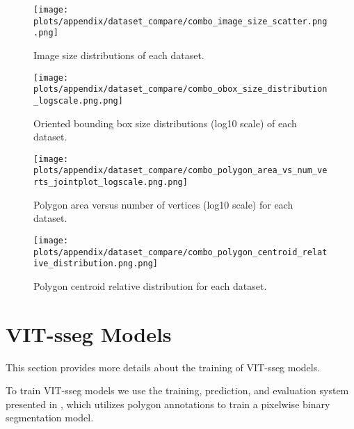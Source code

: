 \begin{figure*}[ht]
\centering
\texttt{[image: plots/appendix/dataset\_compare/combo\_image\_size\_scatter.png.png]}
\caption[]{
    Image size distributions of each dataset.
}
\label{fig:combo_image_size_scatter}
\end{figure*}


\begin{figure*}[ht]
\centering
\texttt{[image: plots/appendix/dataset\_compare/combo\_obox\_size\_distribution\_logscale.png.png]}
\caption[]{
    Oriented bounding box size distributions (log10 scale) of each dataset.
}
\label{fig:combo_obox_size_distribution_logscale}
\end{figure*}

\begin{figure*}[ht]
\centering
\texttt{[image: plots/appendix/dataset\_compare/combo\_polygon\_area\_vs\_num\_verts\_jointplot\_logscale.png.png]}
\caption[]{
    Polygon area versus number of vertices (log10 scale) for each dataset.
}
\label{fig:combo_polygon_area_vs_num_verts_jointplot}
\end{figure*}

\begin{figure*}[ht]
\centering
\texttt{[image: plots/appendix/dataset\_compare/combo\_polygon\_centroid\_relative\_distribution.png.png]}
\caption[]{
    Polygon centroid relative distribution for each dataset.
}
\label{fig:combo_polygon_centroid_relative_distribution}
\end{figure*}


\section{VIT-sseg Models}
\label{sec:vit_models}

This section provides more details about the training of VIT-sseg models.

To train VIT-sseg models we use the training, prediction, and evaluation system presented in
  \cite{Greenwell_2024_WACV, crall_geowatch_2024}, which utilizes polygon annotations to train a pixelwise
  binary segmentation model.


